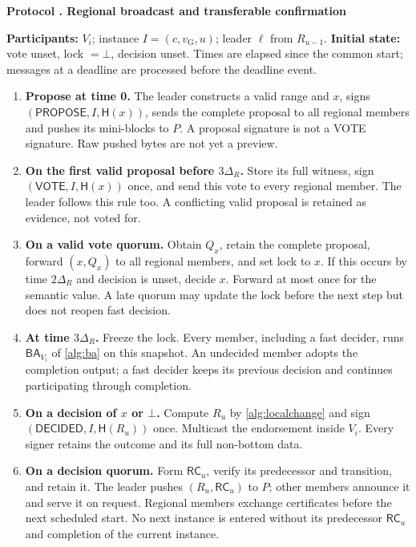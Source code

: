 \documentclass[11pt,a4paper,onecolumn]{article}
\newcommand{\Hash}{\mathsf H}
\newcommand{\RC}{\mathsf{RC}}
\newcommand{\gv}{v_{\mathrm G}}
\newcommand{\BA}{\mathsf{BA}}
\newcommand{\botv}{\bot}
\newcommand{\Tag}[1]{\mathsf{#1}}
\theoremstyle{remark}\newtheorem{example}[definition]{Example}
\newcounter{protocol}
\newenvironment{protocol}[2]{\refstepcounter{protocol}\label{#1}\begin{mdframed}[nobreak=true,linewidth=.6pt,skipabove=10pt,skipbelow=10pt,innertopmargin=8pt,innerbottommargin=8pt]\small\raggedright\noindent\textbf{Protocol \theprotocol. #2}\par\smallskip}{\end{mdframed}}
\begin{document}
\begin{protocol}{alg:regional}{Regional broadcast and transferable confirmation}
\textbf{Participants:} $V_i$; instance $I=(c,\gv,u)$; leader $\ell$ from $R_{u-1}$.
\textbf{Initial state:} vote unset, lock $=\botv$, decision unset.
Times are elapsed since the common start; messages at a deadline are processed
before the deadline event.
\begin{enumerate}[label=\textbf{R\arabic*.}]
\item \textbf{Propose at time 0.} The leader constructs a valid range and
$x$, signs $(\Tag{PROPOSE},I,\Hash(x))$, sends the complete proposal to all
regional members and pushes its mini-blocks to $P$. A proposal signature
is not a VOTE signature. Raw pushed bytes are not yet a preview.
\item \textbf{On the first valid proposal before $3\Delta_R$.} Store its full witness, sign
$(\Tag{VOTE},I,\Hash(x))$ once, and send this vote to every regional member.
The leader follows this rule too. A conflicting valid proposal is retained
as evidence, not voted for.
\item \textbf{On a valid vote quorum.} Obtain $Q_x$, retain the complete
proposal, forward $(x,Q_x)$ to all regional members, and set lock to $x$.
If this occurs by time $2\Delta_R$ and decision is unset, decide $x$.
Forward at most once for the semantic value. A late quorum may update the
lock before the next step but does not reopen fast decision.
\item \textbf{At time $3\Delta_R$.} Freeze the lock. Every member, including
a fast decider, runs $\BA_{V_i}$ of \cref{alg:ba} on this snapshot.
An undecided member adopts the completion output; a fast decider keeps its
previous decision and continues participating through completion.
\item \textbf{On a decision of $x$ or $\botv$.} Compute $R_u$ by \cref{alg:localchange} and
sign $(\Tag{DECIDED},I,\Hash(R_u))$ once. Multicast the endorsement inside
$V_i$. Every signer retains the outcome and its full non-bottom data.
\item \textbf{On a decision quorum.} Form $\RC_u$, verify its predecessor
and transition, and retain it. The leader pushes $(R_u,\RC_u)$ to $P$;
other members announce it and serve it on request. Regional members exchange
certificates before the next scheduled start. No next instance is entered
without its predecessor $\RC_u$ and completion of the current instance.
\end{enumerate}
\end{protocol}
\end{document}
